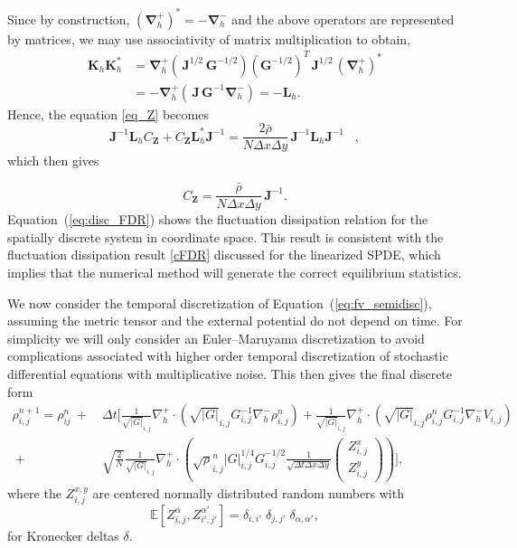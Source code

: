 \documentclass[11pt, a4paper]{article}
\begin{document}
Since by construction, $(\boldsymbol{\nabla}_h^+)^*=-\boldsymbol{\nabla}_h^-$  and the above operators are represented by matrices, we may use associativity of matrix multiplication to obtain, 
\begin{align}
    \boldsymbol{K}_h   \boldsymbol{K}_h^* &=\boldsymbol{\nabla}_h^+( \,\mathbf{J}^{1/2}\, \mathbf{G}^{-1/2} )(\mathbf{G}^{-1/2})^T \,\mathbf{J}^{1/2}\,  (\boldsymbol{\nabla}_h^+ )^*\\
    &= -\boldsymbol{\nabla}_h^+( \,\mathbf{J} \,  \mathbf{G}^{-1} \boldsymbol{\nabla}_h^-) = -\boldsymbol{L}_h.
\end{align}
Hence, the equation \eqref{eq_Z} becomes
\begin{equation*}
    \mathbf{J}^{-1} \mathbf{L}_h C_{\boldsymbol{Z}} + C_{\boldsymbol{Z}} \mathbf{L}_h^* \mathbf{J}^{-1} = 
 \frac{2 \bar{\rho}}{N \Delta x \Delta y} \, \mathbf{J}^{-1}
    \mathbf{L}_h  \mathbf{J}^{-1} \;\;\;,
\end{equation*}
which then gives 


\begin{equation}
    C_{\boldsymbol{Z}} = \frac{\bar{\rho}}{N \Delta x \Delta y} \, \mathbf{J}^{-1}.
\label{eq:disc_FDR}
\end{equation}
Equation~(\ref{eq:disc_FDR}) shows the fluctuation dissipation relation for the spatially discrete system in coordinate space.  This result is consistent with the fluctuation dissipation result \eqref{cFDR} discussed  for the linearized SPDE, which implies that the numerical method will generate the correct equilibrium statistics.



We now consider the temporal discretization of Equation~(\ref{eq:fv_semidisc}), assuming the metric tensor and the external potential do not depend on time.  For simplicity we will only consider an Euler--Maruyama discretization to avoid complications associated with higher order temporal discretization of stochastic differential equations with multiplicative noise.  This then gives the final discrete form
\begin{align}
    \rho_{i,j}^{n+1}  = \rho_{ij}^n \ + \ & \Delta t \Biggl[  \frac{1}{\sqrt{|G|}_{i,j}}\nabla_h^+ \cdot (\sqrt{|G|}_{i,j}G_{i,j}^{-1}\nabla_h^- \rho_{i,j}^n) + \frac{1}{\sqrt{|G|}_{i,j}}\nabla_h^+ \cdot ( \sqrt{|G|}_{i,j} \rho_{i,j}^n G_{i,j}^{-1}\nabla_h^- V_{i,j}) \nonumber \\
    \ +\ & \sqrt{\frac{2}{N}} \frac{1}{\sqrt{|G|}_{i,j}} \nabla_h^+ \cdot \left(\sqrt{\rho}_{i,j}^n |G|_{i,j}^{1/4}G_{i,j}^{-1/2} \frac{1}{\sqrt{ \Delta t \Delta x \Delta y}} \begin{pmatrix}
        Z_{i,j}^x \\[.1cm]
        Z_{i,j}^y
    \end{pmatrix} \right) \Biggr],
    \label{eq:fv_disc}
\end{align}
where the $Z_{i,j}^{x,y}$ are centered normally distributed random numbers with
\[
\mathbb E[ Z_{i,j}^{\alpha}, Z_{i',j'}^{\alpha'}] = \delta_{i,i'} \; \delta_{j,j'} \; \delta_{\alpha,\alpha'},
\]
for Kronecker deltas $\delta$.
\end{document}
